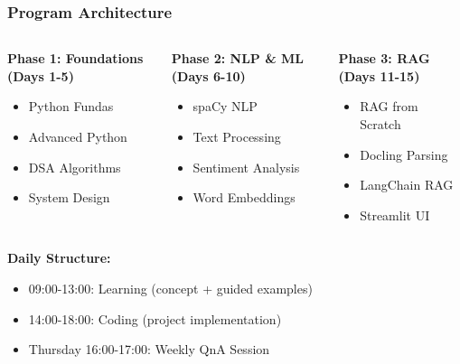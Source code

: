 \begin{frame}[fragile]\frametitle{Program Architecture}
\begin{columns}
    \begin{column}[T]{0.33\linewidth}
      \textbf{Phase 1: Foundations}
      \textbf{(Days 1-5)}
      \begin{itemize}
        \item Python Fundas
        \item Advanced Python
        \item DSA Algorithms
        \item System Design
      \end{itemize}
    \end{column}
    \begin{column}[T]{0.33\linewidth}
      \textbf{Phase 2: NLP \& ML}
      \textbf{(Days 6-10)}
      \begin{itemize}
        \item spaCy NLP
        \item Text Processing
        \item Sentiment Analysis
        \item Word Embeddings
      \end{itemize}
    \end{column}
    \begin{column}[T]{0.33\linewidth}
      \textbf{Phase 3: RAG}
      \textbf{(Days 11-15)}
      \begin{itemize}
        \item RAG from Scratch
        \item Docling Parsing
        \item LangChain RAG
        \item Streamlit UI
      \end{itemize}
    \end{column}
  \end{columns}
  
\vspace{0.3cm}    
\textbf{Daily Structure:}
\begin{itemize}
  \item 09:00-13:00: Learning (concept + guided examples)
  \item 14:00-18:00: Coding (project implementation)
  \item Thursday 16:00-17:00: Weekly QnA Session
\end{itemize}  
\end{frame}

